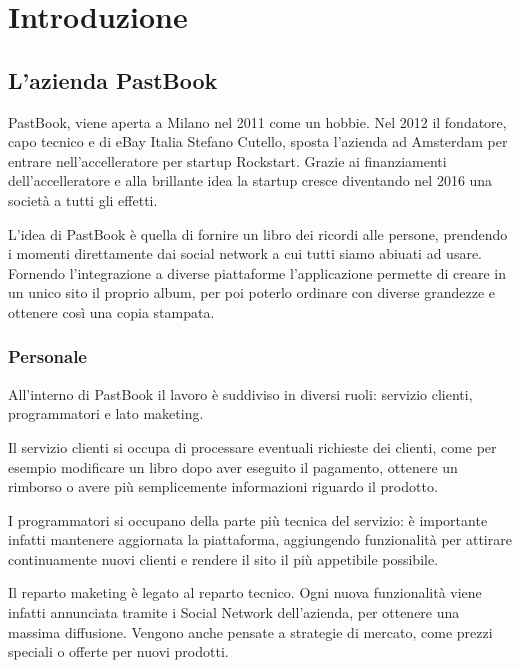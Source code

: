 \mainmatter

\chapter{Introduzione}

\section{L'azienda PastBook}

PastBook, viene aperta a Milano nel 2011 come un hobbie. Nel 2012 il fondatore,
capo tecnico e  di eBay Italia Stefano
Cutello, sposta l'azienda ad Amsterdam per entrare nell'accelleratore per
startup Rockstart. Grazie ai finanziamenti dell'accelleratore e alla brillante
idea la startup cresce diventando nel 2016 una società a tutti gli effetti.

L'idea di PastBook è quella di fornire un libro dei ricordi alle
persone, prendendo i momenti direttamente dai social network a cui tutti siamo
abiuati ad usare. Fornendo l'integrazione a diverse piattaforme l'applicazione
permette di creare in un unico sito il proprio album, per poi
poterlo ordinare con diverse grandezze e ottenere così una copia stampata.

\subsection{Personale}

All'interno di PastBook il lavoro è suddiviso in diversi ruoli: servizio
clienti, programmatori e lato maketing.

Il servizio clienti si occupa di processare eventuali richieste dei clienti,
come per esempio modificare un libro dopo aver eseguito il pagamento, ottenere
un rimborso o avere più semplicemente informazioni riguardo il prodotto.

I programmatori si occupano della parte più tecnica del servizio: è importante
infatti mantenere aggiornata la piattaforma, aggiungendo funzionalità
per attirare continuamente nuovi clienti e rendere il sito il più appetibile
possibile.

Il reparto maketing è legato al reparto tecnico. Ogni nuova funzionalità viene
infatti annunciata tramite i Social Network dell'azienda, per ottenere una
massima diffusione. Vengono anche pensate a strategie di mercato, come prezzi
speciali o offerte per nuovi prodotti.

